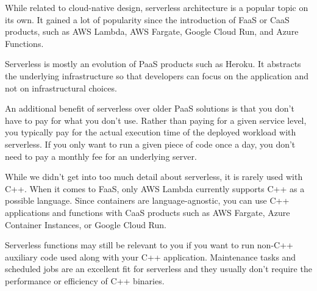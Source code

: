 While related to cloud-native design, serverless architecture is a popular topic on its own. It gained a lot of popularity since the introduction of FaaS or CaaS products, such as AWS Lambda, AWS Fargate, Google Cloud Run, and Azure Functions.

Serverless is mostly an evolution of PaaS products such as Heroku. It abstracts the underlying infrastructure so that developers can focus on the application and not on infrastructural choices.

An additional benefit of serverless over older PaaS solutions is that you don't have to pay for what you don't use. Rather than paying for a given service level, you typically pay for the actual execution time of the deployed workload with serverless. If you only want to run a given piece of code once a day, you don't need to pay a monthly fee for an underlying server.

While we didn't get into too much detail about serverless, it is rarely used with C++. When it comes to FaaS, only AWS Lambda currently supports C++ as a possible language. Since containers are language-agnostic, you can use C++ applications and functions with CaaS products such as AWS Fargate, Azure Container Instances, or Google Cloud Run.

Serverless functions may still be relevant to you if you want to run non-C++ auxiliary code  used along with your C++ application. Maintenance tasks and scheduled jobs are an excellent fit for serverless and they usually don't require the performance or efficiency of C++ binaries.




